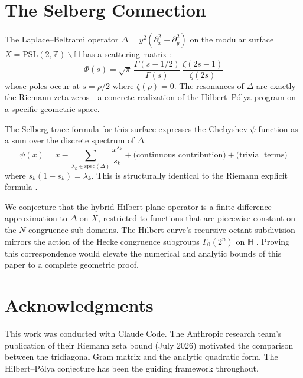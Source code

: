 \documentclass[11pt,a4paper]{article}
\theoremstyle{definition}
\begin{document}
\section{The Selberg Connection}
\label{sec:selberg}

The Laplace--Beltrami operator $\Delta = y^2(\partial_x^2 +
\partial_y^2)$ on the modular surface $X = \mathrm{PSL}(2,
\mathbb{Z})\backslash\mathbb{H}$ has a scattering matrix
\cite{selberg1956,venkov1978}:
\[
\Phi(s) = \sqrt{\pi}\,\frac{\Gamma(s-1/2)}{\Gamma(s)}\,
\frac{\zeta(2s-1)}{\zeta(2s)}
\]
whose poles occur at $s = \rho/2$ where $\zeta(\rho) = 0$. The
resonances of $\Delta$ are exactly the Riemann zeta zeros---a concrete
realization of the Hilbert--P\'{o}lya program on a specific geometric
space.

The Selberg trace formula for this surface expresses the Chebyshev
$\psi$-function as a sum over the discrete spectrum of $\Delta$:
\[
\psi(x) = x - \sum_{\lambda_k \in \mathrm{spec}(\Delta)}
\frac{x^{s_k}}{s_k} + \text{(continuous contribution)} +
\text{(trivial terms)}
\]
where $s_k(1-s_k) = \lambda_k$. This is structurally identical to the
Riemann explicit formula \cite{edwards1974}.

We conjecture that the hybrid Hilbert plane operator is a
finite-difference approximation to $\Delta$ on $X$, restricted to
functions that are piecewise constant on the $N$ congruence
sub-domains. The Hilbert curve's recursive octant subdivision mirrors
the action of the Hecke congruence subgroups $\Gamma_0(2^n)$ on
$\mathbb{H}$ \cite{miyake2006}. Proving this correspondence would
elevate the numerical and analytic bounds of this paper to a complete
geometric proof.

\section*{Acknowledgments}

This work was conducted with Claude Code. The Anthropic research team's
publication of their Riemann zeta bound (July 2026)
\cite{anthropic2026} motivated the comparison between the tridiagonal
Gram matrix and the analytic quadratic form. The Hilbert--P\'{o}lya
conjecture has been the guiding framework throughout.
\end{document}
